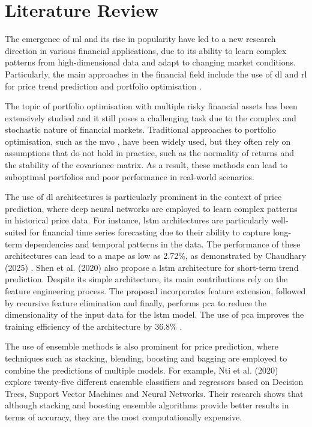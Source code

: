 \section{Literature Review} \label{sec:literature_review}

The emergence of \acrfull{ml} and its rise in popularity have led to a new research direction in various financial applications, due to its ability to learn complex patterns from high-dimensional data and adapt to changing market conditions. Particularly, the main approaches in the financial field include the use of \acrlong{dl} and \acrfull{rl} for price trend prediction \cite{Zhang2023} and portfolio optimisation \cite{Millea2021}. 

The topic of portfolio optimisation with multiple risky financial assets has been extensively studied and it still poses a challenging task due to the complex and stochastic nature of financial markets. Traditional approaches to portfolio optimisation, such as the \acrfull{mvo} \cite{Markowitz1952}, have been widely used, but they often rely on assumptions that do not hold in practice, such as the normality of returns and the stability of the covariance matrix. As a result, these methods can lead to suboptimal portfolios and poor performance in real-world scenarios.

The use of \acrlong{dl} architectures is particularly prominent in the context of price prediction, where deep neural networks are employed to learn complex patterns in historical price data. For instance, \acrfull{lstm} architectures are particularly well-suited for financial time series forecasting due to their ability to capture long-term dependencies and temporal patterns in the data. The performance of these architectures can lead to a \acrfull{mape} as low as 2.72\%, as demonstrated by Chaudhary (2025) \cite{Chaudhary2025}. Shen et al. (2020) \cite{Shen2020} also propose a \acrshort{lstm} architecture for short-term trend prediction. Despite its simple architecture, its main contributions rely on the feature engineering process. The proposal incorporates feature extension, followed by recursive feature elimination and finally, performs \acrfull{pca} to reduce the dimensionality of the input data for the \acrshort{lstm} model. The use of \acrshort{pca} improves the training efficiency of the architecture by 36.8\% \cite{Shen2020}. 

The use of ensemble methods is also prominent for price prediction, where techniques such as stacking, blending, boosting and bagging are employed to combine the predictions of multiple models. For example, Nti et al. (2020) \cite{Nti2020} explore twenty-five different ensemble classifiers and regressors based on Decision Trees, Support Vector Machines and Neural Networks. Their research shows that although stacking and boosting ensemble algorithms provide better results in terms of accuracy, they are the most computationally expensive. 

